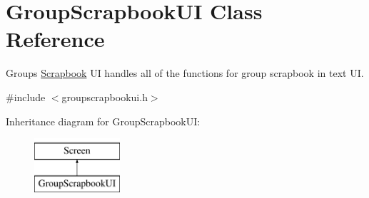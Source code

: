 \hypertarget{classGroupScrapbookUI}{}\section{Group\+Scrapbook\+UI Class Reference}
\label{classGroupScrapbookUI}


Groups \hyperlink{classScrapbook}{Scrapbook} UI handles all of the functions for group scrapbook in text UI.  




{\ttfamily \#include $<$groupscrapbookui.\+h$>$}

Inheritance diagram for Group\+Scrapbook\+UI\+:\begin{figure}[H]
\begin{center}
\leavevmode
\includegraphics[height=2.000000cm]{classGroupScrapbookUI}
\end{center}
\end{figure}
